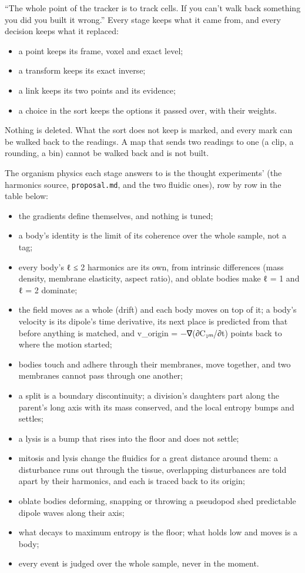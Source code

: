 “The whole point of the tracker is to track cells. If you can't walk back something you did you built it wrong.” Every stage keeps what it came from, and every decision keeps what it replaced:

\begin{itemize}
\item a point keeps its frame, voxel and exact level;
\item a transform keeps its exact inverse;
\item a link keeps its two points and its evidence;
\item a choice in the sort keeps the options it passed over, with their weights.
\end{itemize}

Nothing is deleted. What the sort does not keep is marked, and every mark can be walked back to the readings. A map that sends two readings to one (a clip, a rounding, a bin) cannot be walked back and is not built.

The organism physics each stage answers to is the thought experiments' (the harmonics source, \texttt{proposal.\allowbreak{}md}, and the two fluidic ones), row by row in the table below:

\begin{itemize}
\item the gradients define themselves, and nothing is tuned;
\item a body's identity is the limit of its coherence over the whole sample, not a tag;
\item every body's ℓ ≤ 2 harmonics are its own, from intrinsic differences (mass density, membrane elasticity, aspect ratio), and oblate bodies make ℓ = 1 and ℓ = 2 dominate;
\item the field moves as a whole (drift) and each body moves on top of it; a body's velocity is its dipole's time derivative, its next place is predicted from that before anything is matched, and v\_\allowbreak{}origin = −∇(∂C₁ₘ/∂t) points back to where the motion started;
\item bodies touch and adhere through their membranes, move together, and two membranes cannot pass through one another;
\item a split is a boundary discontinuity; a division's daughters part along the parent's long axis with its mass conserved, and the local entropy bumps and settles;
\item a lysis is a bump that rises into the floor and does not settle;
\item mitosis and lysis change the fluidics for a great distance around them: a disturbance runs out through the tissue, overlapping disturbances are told apart by their harmonics, and each is traced back to its origin;
\item oblate bodies deforming, snapping or throwing a pseudopod shed predictable dipole waves along their axis;
\item what decays to maximum entropy is the floor; what holds low and moves is a body;
\item every event is judged over the whole sample, never in the moment.
\end{itemize}

